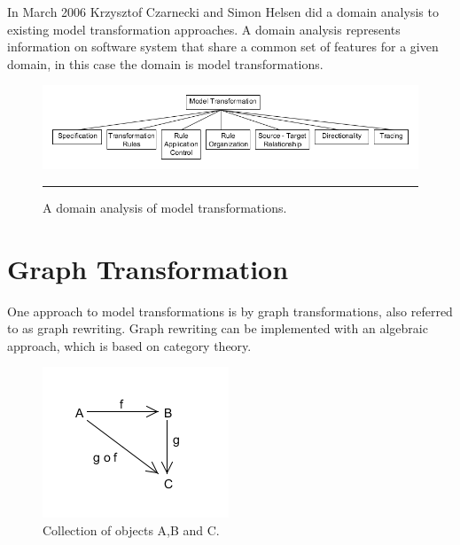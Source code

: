 In March 2006 Krzysztof Czarnecki and Simon Helsen did a domain analysis to
existing model transformation approaches. A domain analysis represents
information on software system that share a common set of features for a given
domain\cite{FODA,Prieto-Diaz1990}, in this case the domain is model
transformations. 

\begin{figure}[H]
  \centering
    \includegraphics[scale=0.6]{./Figures/Model_Transformation_Survey.png}
    \rule{35em}{0.5pt}
  \caption[Domain Analysis of Model Transformations]
  				{A domain analysis of model transformations\cite{Czarnecki2006}.}
  \label{fig:Model_Transformation_Survey}
\end{figure}


\section{Graph Transformation} 

One approach to model transformations is by graph transformations,
also referred to as graph rewriting. Graph rewriting can be implemented with
an algebraic approach, which is based on category theory\cite{Barr1990}.

\begin{figure}[H]
	\centering
	\includegraphics[scale=0.7]{./Figures/categoryTheory.png}
	\caption[Category Theory]{Collection of objects A,B and C.}
	\label{fig:categoryTheory}
\end{figure}

